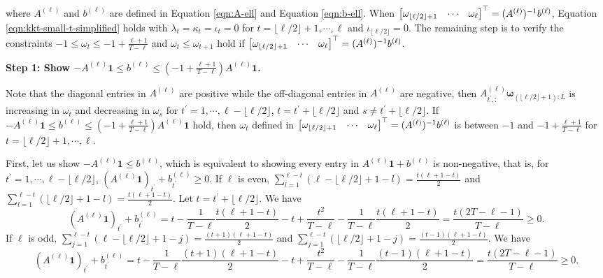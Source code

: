 			where $A^{(\ell)}$ and $b^{(\ell)}$ are defined in Equation \eqref{eqn:A-ell} and Equation \eqref{eqn:b-ell}.
			When $\begin{bmatrix} \omega_{\lfloor \ell/2 \rfloor+1}  & \cdots &  \omega_{\ell} \end{bmatrix}^\top  = (A^{(\ell)})^{-1} b^{(\ell)}$, Equation \eqref{eqn:kkt-small-t-simplified} holds with $\lambda_t = \kappa_t = \iota_t = 0$ for $t = \lfloor \ell/2 \rfloor + 1, \cdots, \ell$ and $\iota_{\lfloor \ell/2 \rfloor} = 0$. The remaining step is to verify the constraints $-1 \leq \omega_t \leq -1 + \frac{\ell+1}{T - \ell}$ and $\omega_t \leq \omega_{t+1}$ hold if $\begin{bmatrix} \omega_{\lfloor \ell/2 \rfloor+1}  & \cdots &  \omega_{\ell} \end{bmatrix}^\top  = (A^{(\ell)})^{-1} b^{(\ell)}$.
			
		\textbf{Step 1: Show $- A^{(\ell)} \bm{1} \leq b^{(\ell)} \leq (-1 + \frac{\ell+1}{T - \ell}) A^{(\ell)}  \bm{1}$.}
  
  Note that the diagonal entries in $A^{(\ell)}$ are positive while the off-diagonal entries in $A^{(\ell)}$ are negative, then $A_{t^\prime, :}^{(\ell)} \bm{\omega}_{(\lfloor \ell/2 \rfloor+1): L}$ is increasing in $\omega_{t}$ and decreasing in $\omega_s$ for $t^\prime = 1, \cdots, \ell - \lfloor \ell/2 \rfloor$, $t = t^\prime+ \lfloor \ell/2 \rfloor$ and $s \neq t^\prime+ \lfloor \ell/2 \rfloor $. If $- A^{(\ell)} \bm{1} \leq b^{(\ell)} \leq (-1 + \frac{\ell+1}{T - \ell}) A^{(\ell)}  \bm{1}$  hold, then $\omega_t$ defined in $\begin{bmatrix} \omega_{\lfloor \ell/2 \rfloor+1}  & \cdots &  \omega_{\ell} \end{bmatrix}^\top  = (A^{(\ell)})^{-1} b^{(\ell)}$  is between $-1$ and $-1 + \frac{\ell+1}{T - \ell}$ for $t = \lfloor \ell/2 \rfloor + 1, \cdots, \ell$.
				
				First, let us show $- A^{(\ell)} \bm{1} \leq b^{(\ell)} $, which is equivalent to showing every entry in $A^{(\ell)} \bm{1} + b^{(\ell)} $ is non-negative, that is, for $t^\prime = 1, \cdots, \ell - \lfloor \ell/2 \rfloor$, $( A^{(\ell)} \bm{1})_{t^\prime} +  b^{(\ell)}_{t^\prime} \geq 0$. If $\ell$ is even, $\sum_{l=1}^{\ell-t} (\ell - \lfloor \ell/2 \rfloor + 1 - l) = \frac{t(\ell+1-t)}{2}$ and $\sum_{l=1}^{\ell-t} ( \lfloor \ell/2 \rfloor  + 1 - l) = \frac{t(\ell+1-t)}{2} $. Let $t = t^\prime + \lfloor \ell/2 \rfloor$. We have 
				\[ ( A^{(\ell)} \bm{1})_{t^\prime} +  b^{(\ell)}_{t^\prime}  = t - \frac{1}{T - \ell} \frac{t(\ell+1-t)}{2} - t + \frac{t^2}{T - \ell} - \frac{1}{T - \ell} \frac{t(\ell+1-t)}{2} = \frac{t(2T - \ell-1)}{T - \ell} \geq 0. \]
				If $\ell$ is odd, $\sum_{j=1}^{\ell-t} (\ell - \lfloor \ell/2 \rfloor + 1 - j) = \frac{(t+1)(\ell+1-t)}{2}$ and $\sum_{j=1}^{\ell-t} ( \lfloor \ell/2 \rfloor  + 1 - j) = \frac{(t-1)(\ell+1-t)}{2} $. We have 
				\[ ( A^{(\ell)} \bm{1})_{t^\prime} +  b^{(\ell)}_{t^\prime}  = t - \frac{1}{T - \ell} \frac{(t+1)(\ell+1-t)}{2} - t + \frac{t^2}{T - \ell} - \frac{1}{T - \ell} \frac{(t-1)(\ell+1-t)}{2} = \frac{t(2T - \ell-1)}{T - \ell} \geq 0. \]
				
